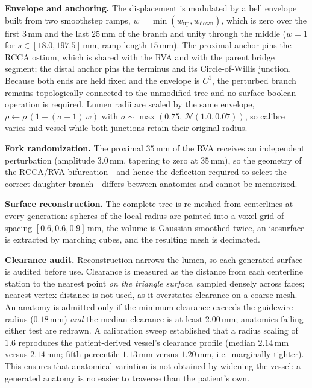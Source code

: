 \textbf{Envelope and anchoring.} The displacement is modulated by a bell envelope built from
two smoothstep ramps, $w = \min(w_{\mathrm{up}}, w_{\mathrm{down}})$, which is zero over the
first $3$\,mm and the last $25$\,mm of the branch and unity through the middle ($w = 1$ for
$s \in [18.0, 197.5]$\,mm, ramp length $15$\,mm). The proximal anchor pins the RCCA ostium,
which is shared with the RVA and with the parent bridge segment; the distal anchor pins the
terminus and its Circle-of-Willis junction. Because both ends are held fixed and the envelope
is $C^{1}$, the perturbed branch remains topologically connected to the unmodified tree and no
surface boolean operation is required. Lumen radii are scaled by the same envelope,
$\rho \leftarrow \rho\,(1 + (\sigma - 1)\,w)$ with
$\sigma \sim \max\!\left(0.75,\, \mathcal{N}(1.0, 0.07)\right)$, so calibre varies mid-vessel
while both junctions retain their original radius.

\textbf{Fork randomization.} The proximal $35$\,mm of the RVA receives an independent
perturbation (amplitude $3.0$\,mm, tapering to zero at $35$\,mm), so the geometry of the
RCCA/RVA bifurcation---and hence the deflection required to select the correct daughter
branch---differs between anatomies and cannot be memorized.

\textbf{Surface reconstruction.} The complete tree is re-meshed from centerlines at every
generation: spheres of the local radius are painted into a voxel grid of spacing
$[0.6, 0.6, 0.9]$\,mm, the volume is Gaussian-smoothed twice, an isosurface is extracted by
marching cubes, and the resulting mesh is decimated.

\textbf{Clearance audit.} Reconstruction narrows the lumen, so each generated surface is
audited before use. Clearance is measured as the distance from each centerline station to the
nearest point \emph{on the triangle surface}, sampled densely across faces; nearest-vertex
distance is not used, as it overstates clearance on a coarse mesh. An anatomy is admitted only
if the minimum clearance exceeds the guidewire radius ($0.18$\,mm) \emph{and} the median
clearance is at least $2.00$\,mm; anatomies failing either test are redrawn. A calibration
sweep established that a radius scaling of $1.6$ reproduces the patient-derived vessel's
clearance profile (median $2.14$\,mm versus $2.14$\,mm; fifth percentile $1.13$\,mm versus
$1.20$\,mm, i.e.\ marginally tighter). This ensures that anatomical variation is not obtained
by widening the vessel: a generated anatomy is no easier to traverse than the patient's own.

